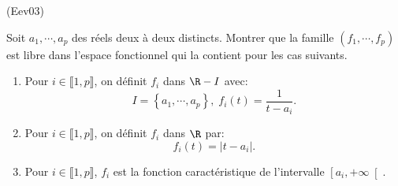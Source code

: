 \begin{tiny}(Eev03)\end{tiny} Soit $a_1, \cdots, a_p$ des réels deux à deux distincts. Montrer que la famille $(f_1,\cdots, f_p)$ est libre dans l'espace fonctionnel qui la contient pour les cas suivants.
\begin{enumerate}
 \item Pour $i \in \llbracket 1,p \rrbracket$, on définit $f_i$ dans $\R - I$ avec:
\[
I = \left\lbrace a_1, \cdots, a_p \right\rbrace,\; f_i(t) = \frac{1}{t - a_i}.
\]

 \item Pour $i \in \llbracket 1,p \rrbracket$, on définit $f_i$ dans $\R$ par:
\[
 f_i(t) = \left| t - a_i\right|.
\]

 \item Pour $i \in \llbracket 1,p \rrbracket$, $f_i$ est la fonction caractéristique de l'intervalle $\left[ a_i, +\infty \right[$. 
\end{enumerate}

